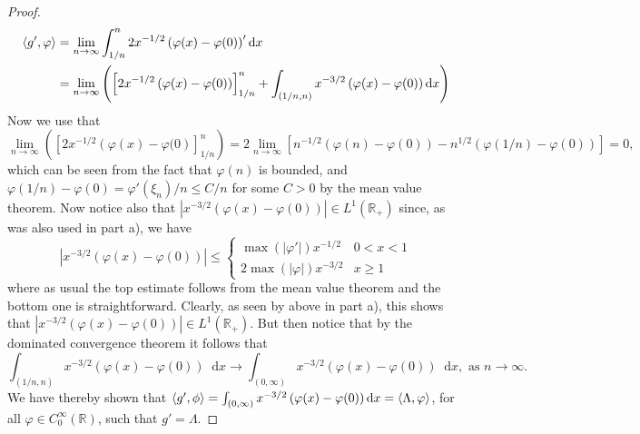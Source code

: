 \documentclass[a4paper,11pt]{article}
\newcommand{\abs}[1]{\left\lvert #1 \right\rvert}
\newcommand*\diff{\mathop{}\!\mathrm{d}}
\newcommand{\R}{\mathbb{R}}
\numberwithin{equation}{section}
\begin{document}
\begin{proof}
\begin{equation}
\begin{aligned}
\braket{g',\varphi}&=\lim\limits_{n\to\infty}\int_{1/n}^{n} 2x^{-1/2}\left(\varphi(x)-\varphi(0)\right)'\diff x\\&=\lim\limits_{n\to\infty}\left(\left[2x^{-1/2}\left(\varphi(x)-\varphi(0)\right)\right]_{1/n}^{n}+\int_{(1/n,n)} x^{-3/2}\left(\varphi(x)-\varphi(0)\right)\diff x\right)
\end{aligned}
\end{equation}
Now we use that \begin{equation}
\lim\limits_{n\to\infty}\left(\left[2x^{-1/2}\left(\varphi(x)-\varphi(0\right)\right]_{1/n}^{n}\right)=2\lim\limits_{n\to\infty}\left[n^{-1/2}(\varphi(n)-\varphi(0))-n^{1/2}(\varphi(1/n)-\varphi(0))\right]=0,
\end{equation}
which can be seen from the fact that $ \varphi(n) $ is bounded, and $ \varphi(1/n)-\varphi(0)=\varphi'(\xi_n)/n\leq C/n $ for some $ C>0 $ by the mean value theorem. Now notice also that $  \abs{x^{-3/2}\left(\varphi(x)-\varphi(0)\right)}\in L^1(\R_+) $ since, as was also used in part a), we have \begin{equation}
\abs{x^{-3/2}\left(\varphi(x)-\varphi(0)\right)}\leq\begin{cases}
\max(\abs{\varphi'})x^{-1/2}&0<x<1\\
2\max(\abs{\varphi})x^{-3/2} & x\geq 1
\end{cases}
\end{equation} where as usual the top estimate follows from the mean value theorem and the bottom one is straightforward. Clearly, as seen by above in part a), this shows that $ \abs{x^{-3/2}\left(\varphi(x)-\varphi(0)\right)}\in L^1(\R_+) $. But then notice that by the dominated convergence theorem it follows that \begin{equation}
\int_{(1/n,n)} x^{-3/2}\left(\varphi(x)-\varphi(0)\right)\diff x\to\int_{(0,\infty)} x^{-3/2}\left(\varphi(x)-\varphi(0)\right)\diff x,\text{ as }n\to\infty.
\end{equation}
We have thereby shown that $ \braket{g',\phi}=\int_{(0,\infty)} x^{-3/2}\left(\varphi(x)-\varphi(0)\right)\diff x=\braket{\Lambda,\varphi} $, for all $ \varphi\in C^\infty_0(\R) $, such that $ g'=\Lambda $.
\end{proof}
\end{document}
